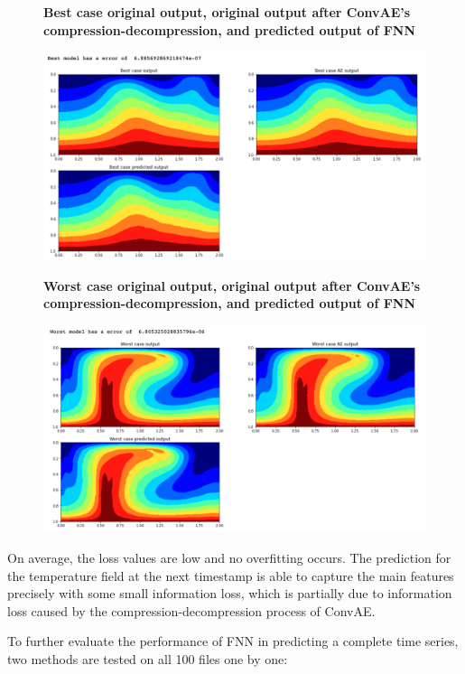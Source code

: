 \begin{figure}[H]
    \textbf{Best case original output, original output after ConvAE's compression-decompression, and predicted output of FNN}\par\medskip
    \includegraphics[scale=0.5]{Report LaTeX/figures/mantle_convection_images/FNN_Best.png}
\end{figure}

\begin{figure}[H]
    \textbf{Worst case original output, original output after ConvAE's compression-decompression, and predicted output of FNN}\par\medskip
    \includegraphics[scale=0.5]{Report LaTeX/figures/mantle_convection_images/FNN_Worst.png}
\end{figure}

On average, the loss values are low and no overfitting occurs. The prediction for the temperature field at the next timestamp is able to capture the main features precisely with some small information loss, which is partially due to information loss caused by the compression-decompression process of ConvAE.

To further evaluate the performance of FNN in predicting a complete time series, two methods are tested on all 100 files one by one: 

